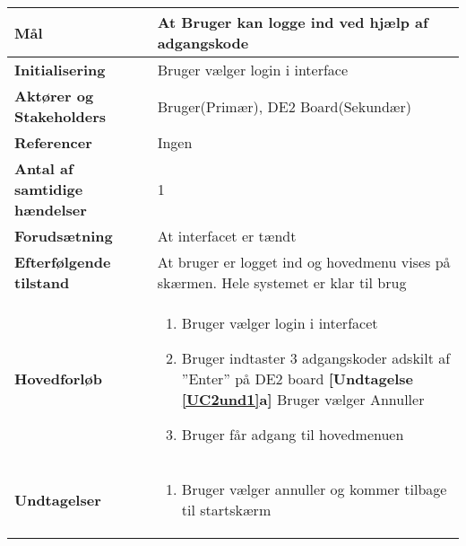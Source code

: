 \begin{table}[H] \centering
\begin{tabular}{|p{6cm}|p{8cm}|}
	\hline
\textbf{Mål}								
&At Bruger kan logge ind ved hjælp af adgangskode
 \\\hline
\textbf{Initialisering}					
&Bruger vælger login i interface
 \\\hline
\textbf{Aktører og Stakeholders}			
&Bruger(Primær), DE2 Board(Sekundær)
 \\\hline
\textbf{Referencer}						
&Ingen
 \\\hline
\textbf{Antal af samtidige hændelser}	
&1
 \\\hline
\textbf{Forudsætning}					
&At interfacet er tændt
 \\\hline
\textbf{Efterfølgende tilstand}			
&At bruger er logget ind og hovedmenu vises på skærmen. Hele systemet er klar til brug
 \\\hline
\textbf{Hovedforløb}						
& 
\begin{enumerate}

\item Bruger vælger login i interfacet

\item \label{UC2und1}Bruger indtaster 3 adgangskoder adskilt af ''Enter'' på DE2 board \newline
\textbf{[Undtagelse \ref{UC2und1}a]} Bruger vælger Annuller

\item Bruger får adgang til hovedmenuen	
 
\end{enumerate}
\\\hline

\textbf{Undtagelser}						
&\begin{enumerate}[label= \ref{UC2und1}a.]
			\item Bruger vælger annuller og kommer tilbage til startskærm
		\end{enumerate}
\\\hline


	\end{tabular}
	\label{UC1} 
\end{table}